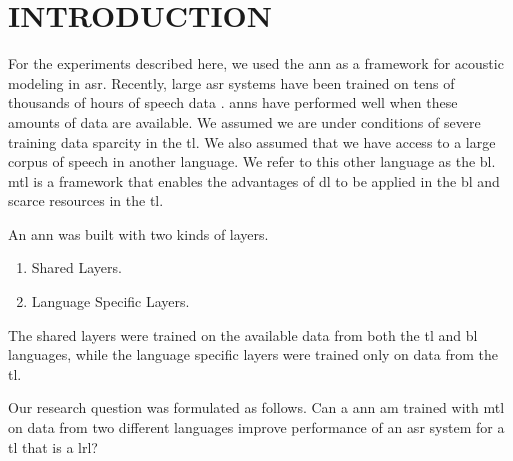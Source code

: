 \section{INTRODUCTION}
\label{sec-2}

For the experiments described here, we used the \gls{ann} as a framework for acoustic modeling in \gls{asr}. 
Recently, large \gls{asr} systems have been trained on tens of thousands of hours of speech data \cite{Heigold13multilingualacoustic}. 
\glspl{ann} have performed well when these amounts of data are available. 
We assumed we are under conditions of severe training data sparcity
in the
\gls{tl}.
We also assumed that we have access to a large corpus of speech in another language. 
We refer to this other language 
as the \gls{bl}. \gls{mtl}\cite{Caruana93multitasklearning:} is a framework that enables the advantages of \gls{dl} to be applied 
in the \gls{bl} and scarce resources in the \gls{tl}.  

An \gls{ann} was built with two kinds of layers.\begin{enumerate}\item Shared Layers.\item Language Specific Layers.\end{enumerate}
The shared layers were trained on the available data from both the \gls{tl} and \gls{bl} languages, while the language specific layers were trained only on data from the \gls{tl}.

Our research question was formulated as follows.
Can a \gls{ann} \gls{am} trained with \gls{mtl} on data  from  two different languages improve performance of an  \gls{asr} system for a  \gls{tl} that is a \gls{lrl}?
